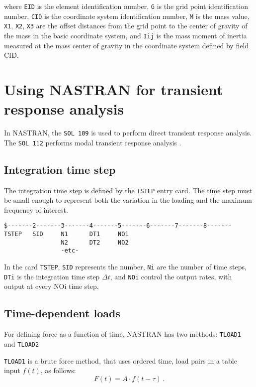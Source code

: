 where \texttt{EID} is the element identification number, \texttt{G} is the grid point identification number, \texttt{CID} is the coordinate system identification number, \texttt{M} is the mass value, \texttt{X1}, \texttt{X2}, \texttt{X3} are the offset distances from the grid point to the center of gravity of the mass in the basic coordinate system, and \texttt{Iij} is the mass moment of inertia measured at the mass center of gravity in the coordinate system defined by field CID.

\section{Using NASTRAN for transient response analysis}

In NASTRAN, the \texttt{SOL 109} is used to perform direct transient response analysis. The \texttt{SOL 112} performs modal transient response analysis \cite{nastran2004basic}.

\subsection{Integration time step}

The integration time step is defined by the \texttt{TSTEP} entry card. The time step must be small enough to represent both the variation in the loading and the maximum frequency of interest.

\begin{lstlisting}
$-------2-------3-------4-------5-------6-------7-------8-------
TSTEP   SID     N1      DT1     NO1
                N2      DT2     NO2
                -etc-
\end{lstlisting}

In the card \texttt{TSTEP}, \texttt{SID} represents the number, \texttt{Ni} are the number of time steps, \texttt{DTi} is the integration time step $\Delta t$, and \texttt{NOi} control the output rates, with output at every NOi time step.

\subsection{Time-dependent loads}

For defining force as a function of time, NASTRAN has two methods: \texttt{TLOAD1} and \texttt{TLOAD2}

\texttt{TLOAD1} is a brute force method, that uses ordered time, load pairs in a table input $f(t)$, as follows:
%
\begin{equation}
    F(t) = A \cdot f\left( t - \tau \right) \,.
\end{equation}

